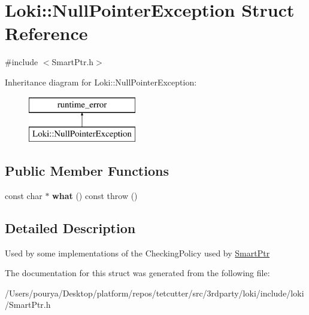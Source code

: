 \hypertarget{structLoki_1_1NullPointerException}{}\section{Loki\+:\+:Null\+Pointer\+Exception Struct Reference}
\label{structLoki_1_1NullPointerException}


{\ttfamily \#include $<$Smart\+Ptr.\+h$>$}

Inheritance diagram for Loki\+:\+:Null\+Pointer\+Exception\+:\begin{figure}[H]
\begin{center}
\leavevmode
\includegraphics[height=2.000000cm]{structLoki_1_1NullPointerException}
\end{center}
\end{figure}
\subsection*{Public Member Functions}
\begin{DoxyCompactItemize}
\item 
\hypertarget{structLoki_1_1NullPointerException_ab6c93d79dc1703eaf5ac558bcbc53b4d}{}const char $\ast$ {\bfseries what} () const   throw ()\label{structLoki_1_1NullPointerException_ab6c93d79dc1703eaf5ac558bcbc53b4d}

\end{DoxyCompactItemize}


\subsection{Detailed Description}
Used by some implementations of the Checking\+Policy used by \hyperlink{classLoki_1_1SmartPtr}{Smart\+Ptr} 

The documentation for this struct was generated from the following file\+:\begin{DoxyCompactItemize}
\item 
/\+Users/pourya/\+Desktop/platform/repos/tetcutter/src/3rdparty/loki/include/loki/Smart\+Ptr.\+h\end{DoxyCompactItemize}
